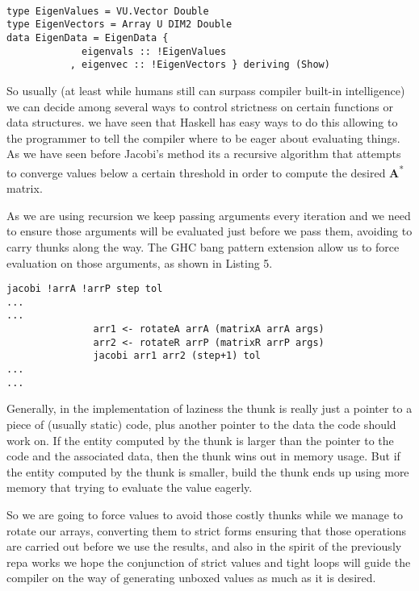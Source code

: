 \documentclass{tmr}
\begin{document}
\begin{lstlisting}[float,captionpos=b,belowcaptionskip=4pt, caption= Strict data types for eigenvalue operations]

type EigenValues = VU.Vector Double
type EigenVectors = Array U DIM2 Double
data EigenData = EigenData {
             eigenvals :: !EigenValues
           , eigenvec :: !EigenVectors } deriving (Show)

\end{lstlisting}

So usually (at least while humans still can surpass compiler built-in intelligence) we can decide among several 
ways to control strictness on certain functions or data structures. we have seen that Haskell has easy ways to do
 this allowing to the programmer to tell the compiler where to be eager 
about evaluating things. As we have seen before Jacobi's method its a recursive algorithm that
 attempts to converge values below a certain threshold 
in order to compute the desired {\textbf A\textsuperscript{*}} matrix.

As we are using recursion we keep passing arguments every iteration and we need to ensure those arguments will be evaluated just before 
we pass them, avoiding to carry thunks along the way. The GHC bang pattern extension allow us to force evaluation on those arguments, as shown
in Listing 5.

\begin{lstlisting}[float,captionpos=b,belowcaptionskip=4pt, caption= Jacobi strict argument passing]
jacobi !arrA !arrP step tol
...
...
               arr1 <- rotateA arrA (matrixA arrA args)
               arr2 <- rotateR arrP (matrixR arrP args)
               jacobi arr1 arr2 (step+1) tol
...
...
\end{lstlisting}

Generally, in the implementation of laziness the thunk is really just a pointer to a piece of (usually static) code, plus another pointer 
to the data the code should work on. If the entity computed by the thunk is larger than the pointer to the code and the associated 
data, then the thunk wins out in memory usage. But if the entity computed by the thunk is smaller, build the thunk ends up using 
more memory that trying to evaluate the value eagerly.

So we are going to force values to avoid those costly thunks while we manage to rotate our arrays, 
converting them to strict forms ensuring that those operations are carried out before we use the results,
and also in the spirit of the previously repa works we hope the conjunction of strict values 
and tight loops will guide the compiler on the way of generating unboxed values as much as it is desired.
\end{document}
